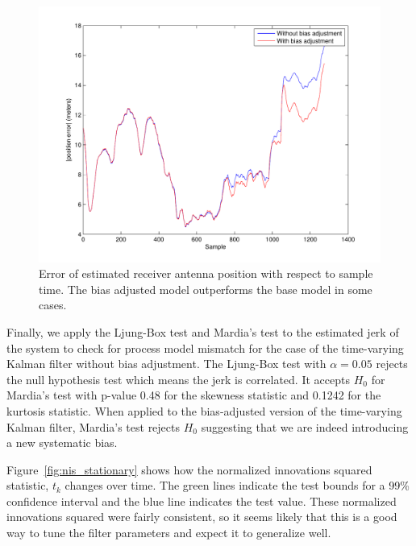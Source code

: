 \begin{figure}
\includegraphics[width=\columnwidth]{error_stationary}
\caption{Error of estimated receiver antenna position with respect to sample time.  The bias adjusted model outperforms the base model in some cases.}
\label{fig:stationary_error}
\end{figure}

Finally, we apply the Ljung-Box test and Mardia's test to the estimated jerk of the system to check for process model mismatch for the case of the time-varying Kalman filter without bias adjustment.  The Ljung-Box test with $\alpha = 0.05$ rejects the null hypothesis test which means the jerk is correlated.  It accepts $H_0$ for Mardia's test with p-value 0.48 for the skewness statistic and 0.1242 for the kurtosis statistic.  When applied to the bias-adjusted version of the time-varying Kalman filter, Mardia's test rejects $H_0$ suggesting that we are indeed introducing a new systematic bias.

Figure~\ref{fig:nis_stationary} shows how the normalized innovations squared statistic, $t_k$ changes over time.  The green lines indicate the test bounds for a 99\% confidence interval and the blue line indicates the test value.  These normalized innovations squared were fairly consistent, so it seems likely that this is a good way to tune the filter parameters and expect it to generalize well.

